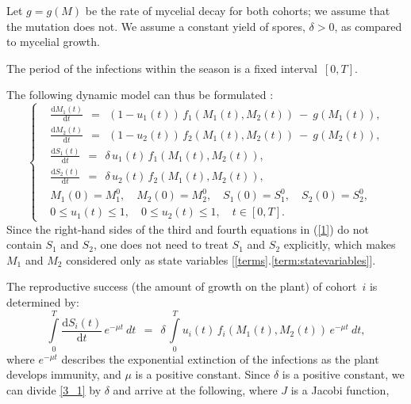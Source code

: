 \documentclass[11pt]{amsart}
\begin{document}
Let $ g = g(M) $ be the rate of mycelial decay for both cohorts; we assume that the mutation does not. We assume a constant yield of spores, $ \delta > 0 $, as compared to mycelial growth. 

The period of the infections within the season is a fixed interval~$ [0, T] $.

The following dynamic model can thus be formulated 
\cite{YegorovGrognardMailleretHalkettBernhard2019}:
\begin{equation}
\left\{ \begin{aligned}
& \frac{\mathrm{d} M_1(t)}{\mathrm{d} t} \:\: = \:\: \left(1 - u_1(t)\right) \,
  f_1\left(M_1(t), M_2(t)\right) \: - \: g\left(M_1(t)\right), \\
& \frac{\mathrm{d} M_2(t)}{\mathrm{d} t} \:\: = \:\: \left(1 - u_2(t)\right) \,
  f_2\left(M_1(t), M_2(t)\right) \: - \: g\left(M_2(t)\right), \\
& \frac{\mathrm{d} S_1(t)}{\mathrm{d} t} \:\: = \:\: \delta \, u_1(t) \,
  f_1\left(M_1(t), M_2(t)\right), \\
& \frac{\mathrm{d} S_2(t)}{\mathrm{d} t} \:\: = \:\: \delta \, u_2(t) \,
  f_2\left(M_1(t), M_2(t)\right), \\
& M_1(0) = M_1^0, \quad M_2(0) = M_2^0, \quad S_1(0) = S_1^0,
  \quad S_2(0) = S_2^0, \\
& 0 \leqslant u_1(t) \leqslant 1, \quad 0 \leqslant u_2(t) \leqslant 1,
  \quad t \in [0, T].
\end{aligned} \right.  \label{1}
\end{equation}
Since the right-hand sides of the third and fourth equations in (\ref{1}) do
not contain $ S_1 $ and $ S_2 $, one does not need to treat $ S_1 $ and $ S_2 $
explicitly, which makes $ M_1 $ and $ M_2 $ considered only as state variables [\ref{terms}.\ref{term:statevariables}].

The reproductive success (the amount of growth on the plant) of cohort~$ i $ is determined by:
\begin{equation}
\int\limits_0^T \frac{\mathrm{d} S_i(t)}{\mathrm{d} t} \, e^{-\mu t}
    \: dt \:\: = \:\: \delta \,
\int\limits_0^T u_i(t) \, f_i\left(M_1(t), M_2(t)\right) \, e^{-\mu t} \: dt,  \label{3_1}
\end{equation}
where $ e^{-\mu t} $ describes the exponential extinction of the infections as the plant develops immunity,
and $ \mu $ is a positive constant. Since $ \delta $ is a positive constant,
we can divide \cref{3_1} by $ \delta $ and arrive at the following, where $J$ is a Jacobi function, 
\end{document}
